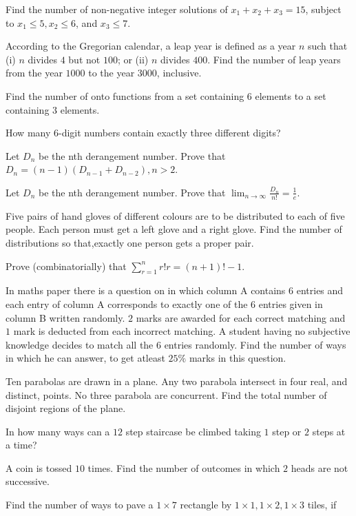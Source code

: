 \item Find the number of non-negative integer solutions of $x_1 + x_2 + x_3 =15$, subject to $x_1 \leq 5,
  x_2 \leq 6$, and $x_3 \leq 7$.
\item According to the Gregorian calendar, a leap year is defined as a year $n$ such that (i) $n$ divides
  $4$ but not $100$; or (ii) $n$ divides $400$. Find the number of leap years from the year $1000$ to the
  year $3000$, inclusive.
\item Find the number of onto functions from a set containing $6$ elements to a set containing $3$ elements.
\item How many $6$-digit numbers contain exactly three different digits?
\item Let $D_n$ be the nth derangement number. Prove that $D_n = (n - 1)(D_{n - 1} + D_{n - 2}), n > 2$.
\item Let $D_n$ be the nth derangement number. Prove that $\displaystyle\lim_{n\to\infty}\frac{D_n}{n!} =
  \frac{1}{e}$.
\item Five pairs of hand gloves of different colours are to be distributed to each of five people. Each
  person must get a left glove and a right glove. Find the number of distributions so that,exactly one
  person gets a proper pair.
\item Prove (combinatorially) that $\displaystyle\sum_{r = 1}^n r ! r = ( n + 1)! − 1$.
\item In maths paper there is a question on  in which column A contains $6$ entries
  and each entry of column A corresponds to exactly one of the $6$ entries given in column B written
  randomly. $2$ marks are awarded for each correct matching and $1$ mark is deducted from each incorrect
  matching. A student having no subjective knowledge decides to match all the 6 entries randomly. Find the
  number of ways in which he can answer, to get atleast $25\%$ marks in this question.
\item Ten parabolas are drawn in a plane. Any two parabola intersect in four real, and distinct, points. No
  three parabola are concurrent. Find the total number of disjoint regions of the plane.
\item In how many ways can a $12$ step staircase be climbed taking $1$ step or $2$ steps at a time?
\item A coin is tossed $10$ times. Find the number of outcomes in which $2$ heads are not successive.
\item Find the number of ways to pave a $1\times7$ rectangle by $1\times1, 1\times2, 1\times3$ tiles, if
